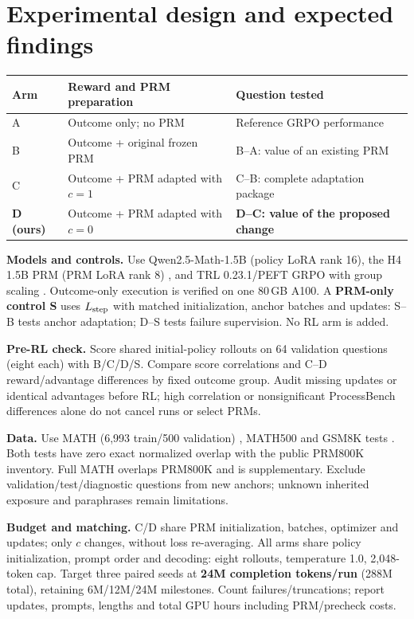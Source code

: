 \documentclass{article}
\begin{document}
\section{Experimental design and expected findings}
\begin{center}
\small
\renewcommand{\arraystretch}{1.12}
\begin{tabularx}{\linewidth}{@{}l L L@{}}
\toprule
\textbf{Arm} & \textbf{Reward and PRM preparation} & \textbf{Question tested} \\
\midrule
A & Outcome only; no PRM & Reference GRPO performance \\
B & Outcome + original frozen PRM & B--A: value of an existing PRM \\
C & Outcome + PRM adapted with $c=1$ & C--B: complete adaptation package \\
\textbf{D (ours)} & Outcome + PRM adapted with $c=0$ & \textbf{D--C: value of the proposed change} \\
\bottomrule
\end{tabularx}
\end{center}
\textbf{Models and controls.} Use Qwen2.5-Math-1.5B (policy LoRA rank 16), the H4 1.5B PRM (PRM LoRA rank 8) \citep{h4prm}, and TRL 0.23.1/PEFT GRPO with group scaling \citep{trl}. Outcome-only execution is verified on one 80\,GB A100. A \textbf{PRM-only control S} uses $L_{\rm step}$ with matched initialization, anchor batches and updates: S--B tests anchor adaptation; D--S tests failure supervision. No RL arm is added.

\textbf{Pre-RL check.} Score shared initial-policy rollouts on 64 validation questions (eight each) with B/C/D/S. Compare score correlations and C--D reward/advantage differences by fixed outcome group. Audit missing updates or identical advantages before RL; high correlation or nonsignificant ProcessBench differences alone do not cancel runs or select PRMs.

\textbf{Data.} Use MATH (6,993 train/500 validation) \citep{hendrycks2021}, MATH500 and GSM8K tests \citep{cobbe2021}. Both tests have zero exact normalized overlap with the public PRM800K inventory. Full MATH overlaps PRM800K \citep{prmdata} and is supplementary. Exclude validation/test/diagnostic questions from new anchors; unknown inherited exposure and paraphrases remain limitations.

\textbf{Budget and matching.} C/D share PRM initialization, batches, optimizer and updates; only $c$ changes, without loss re-averaging. All arms share policy initialization, prompt order and decoding: eight rollouts, temperature 1.0, 2,048-token cap. Target three paired seeds at \textbf{24M completion tokens/run} (288M total), retaining 6M/12M/24M milestones. Count failures/truncations; report updates, prompts, lengths and total GPU hours including PRM/precheck costs.
\end{document}

